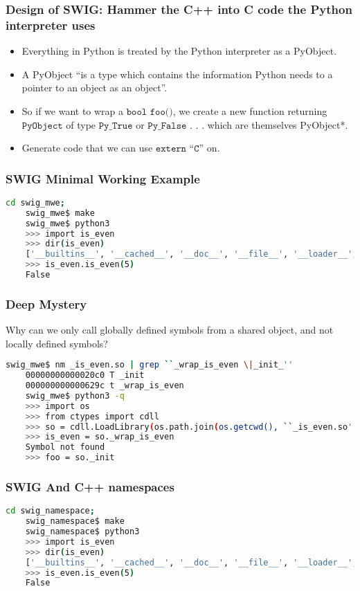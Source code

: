 \documentclass{beamer}
\begin{document}
\begin{frame}[fragile]
  \frametitle{Design of SWIG: Hammer the C++ into C code the Python interpreter uses}
  \begin{itemize}
  \item Everything in Python is treated by the Python interpreter as a PyObject.
  \item A PyObject ``is a type which contains the information Python needs to a pointer to an object as an object''.
  \item So if we want to wrap a $\texttt{bool foo()}$, we create a new function returning $\texttt{PyObject}$ of type $\texttt{Py\_True}$ or $\texttt{Py\_False}$ . . . which are themselves PyObject*.
  \item Generate code that we can use $\texttt{extern ``C''}$ on.
  \end{itemize}
\end{frame}


\begin{frame}[fragile]
  \frametitle{SWIG Minimal Working Example}
  \begin{lstlisting}[language=bash]
    cd swig_mwe;
    swig_mwe$ make
    swig_mwe$ python3
    >>> import is_even
    >>> dir(is_even)
    ['__builtins__', '__cached__', '__doc__', '__file__', '__loader__', '__name__', '__package__', '__spec__', '_is_even', '_newclass', '_object', '_swig_getattr', '_swig_getattr_nondynamic', '_swig_property', '_swig_repr', '_swig_setattr', '_swig_setattr_nondynamic', 'is_even']
    >>> is_even.is_even(5)
    False
  \end{lstlisting}
\end{frame}

\begin{frame}[fragile]
  \frametitle{Deep Mystery}
  Why can we only call globally defined symbols from a shared object, and not locally defined symbols?
  \begin{lstlisting}[language=bash]
    swig_mwe$ nm _is_even.so | grep ``_wrap_is_even \|_init_''
    00000000000020c0 T _init
    000000000000629c t _wrap_is_even
    swig_mwe$ python3 -q
    >>> import os
    >>> from ctypes import cdll
    >>> so = cdll.LoadLibrary(os.path.join(os.getcwd(), ``_is_even.so'')))
    >>> is_even = so._wrap_is_even
    Symbol not found
    >>> foo = so._init
  \end{lstlisting}
\end{frame}



\begin{frame}[fragile]
  \frametitle{SWIG And C++ namespaces}
  \begin{lstlisting}[language=bash]
    cd swig_namespace;
    swig_namespace$ make
    swig_namespace$ python3
    >>> import is_even
    >>> dir(is_even)
    ['__builtins__', '__cached__', '__doc__', '__file__', '__loader__', '__name__', '__package__', '__spec__', '_is_even', '_newclass', '_object', '_swig      _getattr', '_swig_getattr_nondynamic', '_swig_property', '_swig_repr', '_swig_setattr', '_swig_setattr_nondynamic', 'is_even']
    >>> is_even.is_even(5)
    False
  \end{lstlisting}
\end{frame}
\end{document}
